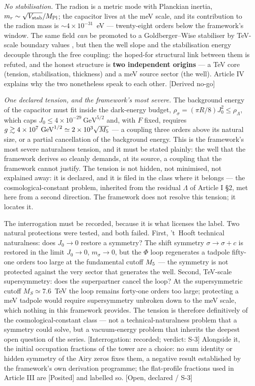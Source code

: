 \emph{No stabilisation.} The radion is a metric mode with Planckian inertia, $m_{r}\sim\sqrt{V_{\rm stab}}/M_{\rm Pl}$; the capacitor lives at the meV scale, and its contribution to the radion mass is $\sim4\times10^{-31}$~eV --- twenty-eight orders below the framework's window. The same field \emph{can} be promoted to a Goldberger--Wise stabiliser by TeV-scale boundary values \cite{GW99}, but then the well slope and the stabilisation energy decouple through the free coupling: the hoped-for structural link between them is refuted, and the honest structure is \textbf{two independent origins} --- a TeV core (tension, stabilisation, thickness) and a meV source sector (the well). Article IV explains why the two nonetheless speak to each other. [Derived no-go]

\emph{One declared tension, and the framework's most severe.} The background energy of the capacitor must fit inside the dark-energy budget, $\rho_{\sigma}=(\pi R/8)J_{0}^{2}\leq\rho_{\Lambda}$, which caps $J_{0}\leq4\times10^{-29}~\mathrm{GeV}^{5/2}$ and, with $F$ fixed, requires $g\gtrsim4\times10^{7}~\mathrm{GeV}^{1/2}\simeq2\times10^{3}\sqrt{M_5}$ --- a coupling three orders above its natural size, or a partial cancellation of the background energy. This is the framework's most severe naturalness tension, and it must be stated plainly: the well that the framework derives so cleanly demands, at its source, a coupling that the framework cannot justify. The tension is not hidden, not minimised, not explained away: it is declared, and it is filed in the class where it belongs --- the cosmological-constant problem, inherited from the residual $\Lambda$ of Article I \S2, met here from a second direction. The framework does not resolve this tension; it locates it.

The interrogation must be recorded, because it is what licenses the label. Two natural protections were tested, and both failed. First, 't~Hooft technical naturalness: does $J_{0}\to0$ restore a symmetry? The shift symmetry $\sigma\to\sigma+c$ is restored in the limit $J_{0}\to0$, $m_{\sigma}\to0$, but the $\Phi$ loop regenerates a tadpole fifty-one orders too large at the fundamental cutoff $M_5$ --- the symmetry is not protected against the very sector that generates the well. Second, TeV-scale supersymmetry: does the superpartner cancel the loop? At the supersymmetric cutoff $M_{S}\simeq7.6$~TeV the loop remains forty-one orders too large; protecting a meV tadpole would require supersymmetry unbroken down to the meV scale, which nothing in this framework provides. The tension is therefore definitively of the cosmological-constant class --- not a technical-naturalness problem that a symmetry could solve, but a vacuum-energy problem that inherits the deepest open question of the series. [Interrogation: recorded; verdict: S-3] Alongside it, the initial occupation fractions of the tower are a choice: no sum identity or hidden symmetry of the Airy zeros fixes them, a negative result established by the framework's own derivation programme; the flat-profile fractions used in Article III are [Posited] and labelled so. [Open, declared / S-3]

